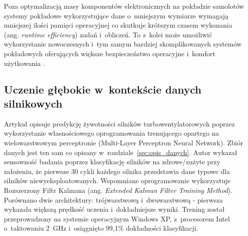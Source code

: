 Poza optymalizacją masy komponentów elektronicznych na pokładzie samolotów systemy pokładowe wykorzystujące dane o~mniejszym wymiarze wymagają mniejszej ilości pamięci operacyjnej co skutkuje krótszym czasem wykonania (ang. \textit{runtime efficiency}) zadań i~obliczeń. To z~kolei może umożliwić wykorzystanie nowoczesnych i~tym samym bardziej skomplikowanych systemów pokładowych oferujących większe bezpieczeństwo operacyjne i~komfort użytkowania \cite{deeplearningbook}.

\subsection{Uczenie głębokie w~kontekście danych silnikowych}

Artykuł \cite{rnn_rul} opisuje predykcję żywotności silników turbowentylatorowych poprzez wykorzystanie własnościowego oprogramowania trenującego opartego na wielowarstwowym perceptronie (Multi-Layer Perceptron Neural Network). Zbiór danych jest ten sam co opisany w~rozdziale~\ref{sec:opis_danych}. Autor wykazał sensowność badania poprzez klasyfikację silników na zdrowe/zużyte przy założeniu, że pierwsze 30 cykli każdego silnika przedstawia dane typowe dla silników niewyeksploatowanych. Wspomniane oprogramowanie wykorzystuje Rozszerzony Filtr Kalmana (ang. \textit{Extended Kalman Filter Training Method}). Porównano dwie architektury: trójwarstwową i~dwuwarstwową - pierwsza wykazała większą prędkość uczenia i~dokładniejsze wyniki. Trening został przeprowadzony na systemie operacyjnym Windows XP, z~procesorem Intel o~taktowaniu 2~GHz i~osiągnięto 99,1\% dokładności klasyfikacji.

